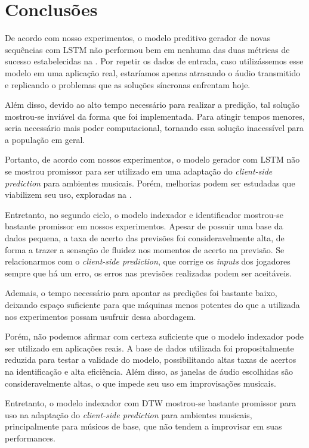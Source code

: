 \chapter{Conclusões}

De acordo com nosso experimentos, o modelo preditivo gerador de novas sequências com LSTM não performou bem em nenhuma das duas métricas de sucesso estabelecidas na . Por repetir os dados de entrada, caso utilizássemos esse modelo em uma aplicação real, estaríamos apenas atrasando o áudio transmitido e replicando o problemas que as soluções síncronas enfrentam hoje.

Além disso, devido ao alto tempo necessário para realizar a predição, tal solução mostrou-se inviável da forma que foi implementada. Para atingir tempos menores, seria necessário mais poder computacional, tornando essa solução inacessível para a população em geral.

Portanto, de acordo com nossos experimentos, o modelo gerador com LSTM não se mostrou promissor para ser utilizado em uma adaptação do \textit{client-side prediction} para ambientes musicais. Porém, melhorias podem ser estudadas que viabilizem seu uso, exploradas na .

Entretanto, no segundo ciclo, o modelo indexador e identificador mostrou-se bastante promissor em nossos experimentos. Apesar de possuir uma base da dados pequena, a taxa de acerto das previsões foi consideravelmente alta, de forma a trazer a sensação de fluidez nos momentos de acerto na previsão. Se relacionarmos com o \textit{client-side prediction}, que corrige os \textit{inputs} dos jogadores sempre que há um erro, os erros nas previsões realizadas podem ser aceitáveis.

Ademais, o tempo necessário para apontar as predições foi bastante baixo, deixando espaço suficiente para que máquinas menos potentes do que a utilizada nos experimentos possam usufruir dessa abordagem.

Porém, não podemos afirmar com certeza suficiente que o modelo indexador pode ser utilizado em aplicações reais. A base de dados utilizada foi propositalmente reduzida para testar a validade do modelo, possibilitando altas taxas de acertos na identificação e alta eficiência. Além disso, as janelas de áudio escolhidas são consideravelmente altas, o que impede seu uso em improvisações musicais.

Entretanto, o modelo indexador com DTW mostrou-se bastante promissor para uso na adaptação do \textit{client-side prediction} para ambientes musicais, principalmente para músicos de base, que não tendem a improvisar em suas performances.

